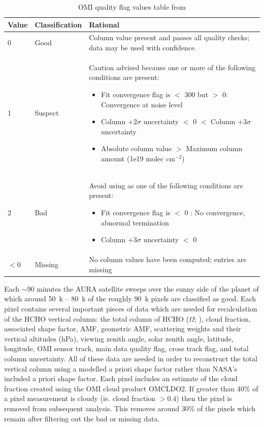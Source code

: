   
  \begin{table}
    \caption{OMI quality flag values table from \textcite{Kurosu2014}}
    \begin{tabular}{  l  l  p{10cm} }
      \hline
      \textbf{Value} & \textbf{Classification} & \textbf{Rational} 
      \\ \hline
      0 & Good & Column value present and passes all quality checks; data may be used with confidence. 
      \\ \hline
      1 & Suspect & Caution advised because one or more of the following conditions are present: 
      \begin{itemize}
        \item Fit convergence flag is $<$ 300 but $>$ 0: Convergence at noise level
        \item Column $+ 2 \sigma$ uncertainty $<$ 0 $<$ Column $ + 3 \sigma $ uncertainty
        \item Absolute column value $>$ Maximum column amount (1e19 molec cm$^{-2}$)
      \end{itemize}
      \\ \hline
      2 & Bad & Avoid using as one of the following conditions are present: 
      \begin{itemize}
        \item Fit convergence flag is $<$ 0 : No convergence, abnormal termination
        \item Column $+ 3 \sigma$ uncertainty $<$ 0
      \end{itemize}
      \\ \hline
      $<0$ & Missing & No column values have been computed; entries are missing
      \\ \hline
    \end{tabular}
    \label{Model:datasets:OMHCHO:tab_qflag}
  \end{table}
  
  Each $\sim90$ minutes the AURA satellite sweeps over the sunny side of the planet of which around 50~k -- 80~k of the roughly 90~k pixels are classified as good.
  Each pixel contains several important pieces of data which are needed for recalculation of the HCHO vertical column: the total column of HCHO ($\Omega$; \moleccm), cloud fraction, associated shape factor, AMF, geometric AMF, scattering weights and their vertical altitudes (hPa), viewing zenith angle, solar zenith angle, latitude, longitude, OMI sensor track, main data quality flag, cross track flag, and total column uncertainty.
  All of these data are needed in order to reconstruct the total vertical column using a modelled a priori shape factor rather than NASA's included a priori shape factor.
  Each pixel includes an estimate of the cloud fraction created using the OMI cloud product OMCLDO2.
  If greater than 40\% of a pixel measurement is cloudy (ie. cloud fraction $>0.4$) then the pixel is removed from subsequent analysis.
  This removes around 30\% of the pixels which remain after filtering out the bad or missing data.
  
